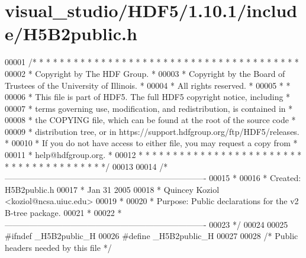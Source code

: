 \hypertarget{visual__studio_2_h_d_f5_21_810_81_2include_2_h5_b2public_8h_source}{}\section{visual\+\_\+studio/\+H\+D\+F5/1.10.1/include/\+H5\+B2public.h}
\label{visual__studio_2_h_d_f5_21_810_81_2include_2_h5_b2public_8h_source}

\begin{DoxyCode}
00001 \textcolor{comment}{/* * * * * * * * * * * * * * * * * * * * * * * * * * * * * * * * * * * * * * *}
00002 \textcolor{comment}{ * Copyright by The HDF Group.                                               *}
00003 \textcolor{comment}{ * Copyright by the Board of Trustees of the University of Illinois.         *}
00004 \textcolor{comment}{ * All rights reserved.                                                      *}
00005 \textcolor{comment}{ *                                                                           *}
00006 \textcolor{comment}{ * This file is part of HDF5.  The full HDF5 copyright notice, including     *}
00007 \textcolor{comment}{ * terms governing use, modification, and redistribution, is contained in    *}
00008 \textcolor{comment}{ * the COPYING file, which can be found at the root of the source code       *}
00009 \textcolor{comment}{ * distribution tree, or in https://support.hdfgroup.org/ftp/HDF5/releases.  *}
00010 \textcolor{comment}{ * If you do not have access to either file, you may request a copy from     *}
00011 \textcolor{comment}{ * help@hdfgroup.org.                                                        *}
00012 \textcolor{comment}{ * * * * * * * * * * * * * * * * * * * * * * * * * * * * * * * * * * * * * * */}
00013 
00014 \textcolor{comment}{/*-------------------------------------------------------------------------}
00015 \textcolor{comment}{ *}
00016 \textcolor{comment}{ * Created:             H5B2public.h}
00017 \textcolor{comment}{ *                      Jan 31 2005}
00018 \textcolor{comment}{ *                      Quincey Koziol <koziol@ncsa.uiuc.edu>}
00019 \textcolor{comment}{ *}
00020 \textcolor{comment}{ * Purpose:             Public declarations for the v2 B-tree package.}
00021 \textcolor{comment}{ *}
00022 \textcolor{comment}{ *-------------------------------------------------------------------------}
00023 \textcolor{comment}{ */}
00024 
00025 \textcolor{preprocessor}{#ifndef \_H5B2public\_H}
00026 \textcolor{preprocessor}{#define \_H5B2public\_H}
00027 
00028 \textcolor{comment}{/* Public headers needed by this file */}

\end{DoxyCode}
